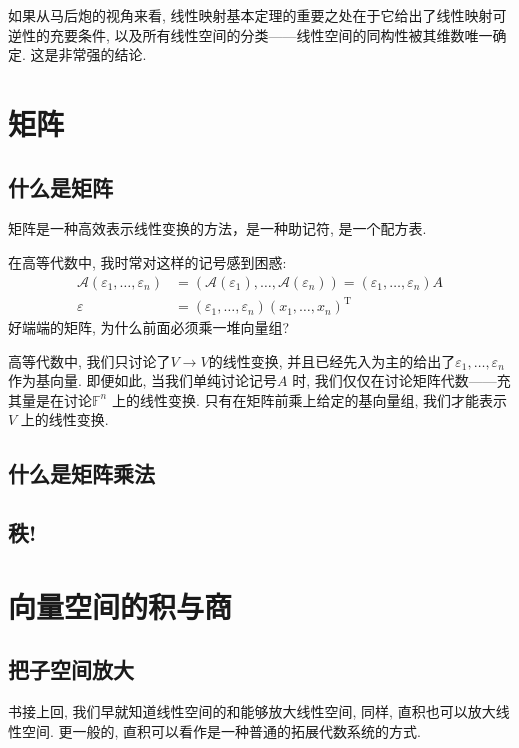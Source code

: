 如果从马后炮的视角来看,
线性映射基本定理的重要之处在于它给出了线性映射可逆性的充要条件,
以及所有线性空间的分类——线性空间的同构性被其维数唯一确定. 这是非常强的结论.

\section{矩阵}
\subsection{什么是矩阵}
矩阵是一种高效表示线性变换的方法，是一种助记符, 是一个配方表.

在高等代数中, 我时常对这样的记号感到困惑:
\begin{align*}
    \mathscr{A}(\varepsilon_{1}, \dots, \varepsilon_{n}) &=
    (\mathscr{A}(\varepsilon_{1}), \dots,
    \mathscr{A}(\varepsilon_{n})) = (\varepsilon_{1},
    \dots, \varepsilon_{n})A\\
    \varepsilon &= (\varepsilon_{1}, \dots, \varepsilon_{n})
    (x_{1}, \dots,   x_{n})^{\mathrm{T}}
\end{align*}
好端端的矩阵, 为什么前面必须乘一堆向量组?

高等代数中, 我们只讨论了\(V \to V\)的线性变换,
并且已经先入为主的给出了\(\varepsilon_{1}, \dots, \varepsilon_{n}\) 作为基向量.
即便如此, 当我们单纯讨论记号\(A\) 时,
我们仅仅在讨论矩阵代数——充其量是在讨论\(\mathbb{F}^{n}\) 上的线性变换.
只有在矩阵前乘上给定的基向量组, 我们才能表示\(V\) 上的线性变换.

\subsection{什么是矩阵乘法}
\subsection{秩!}
\section{向量空间的积与商}
\subsection{把子空间放大}
书接上回, 我们早就知道线性空间的和能够放大线性空间, 同样, 直积也可以放大线性空间.
更一般的, 直积可以看作是一种普通的拓展代数系统的方式.

